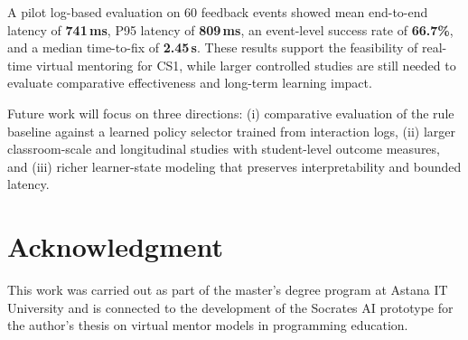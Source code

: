 ﻿\documentclass[conference]{IEEEtran}
\newcommand{\system}{Socrates AI}
\begin{document}
A pilot log-based evaluation on 60 feedback events showed mean end-to-end latency of \textbf{741\,ms}, P95 latency of \textbf{809\,ms}, an event-level success rate of \textbf{66.7\%}, and a median time-to-fix of \textbf{2.45\,s}. These results support the feasibility of real-time virtual mentoring for CS1, while larger controlled studies are still needed to evaluate comparative effectiveness and long-term learning impact.

Future work will focus on three directions: (i) comparative evaluation of the rule baseline against a learned policy selector trained from interaction logs, (ii) larger classroom-scale and longitudinal studies with student-level outcome measures, and (iii) richer learner-state modeling that preserves interpretability and bounded latency.

\section*{Acknowledgment}

This work was carried out as part of the master's degree program at Astana IT University and is connected to the development of the \system{} prototype for the author's thesis on virtual mentor models in programming education.



\end{document}
